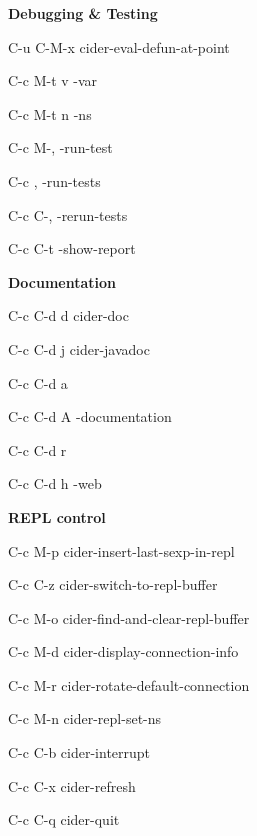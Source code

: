 \documentclass[a4paper,10pt]{article}
\renewcommand\section[1]{\bigskip\par\textbf{\large#1}\medskip}
\newcommand\keyify[1]{\keys{\ttfamily#1}}
\begin{document}
\begin{multicols}{2}
\columnbreak

\section{Debugging \& Testing}
\begin{keylist}[labelwidth=\widthof{\keyify{C-c C-d C-a}}]
\item[C-u C-M-x] cider-eval-defun-at-point
\item[C-c M-t v] -var
\item[C-c M-t n] \ns                    -ns
\item[C-c M-,] -run-test
\item[C-c ,]   \ns            -run-tests
\item[C-c C-,] \ns            -rerun-tests
\item[C-c C-t] \ns            -show-report
\end{keylist}

\section{Documentation}
\begin{keylist}[labelwidth=\widthof{\keyify{C-c C-d C-a}}]
  \item[C-c C-d d] cider-doc
  \item[C-c C-d j] cider-javadoc
  \item[C-c C-d a] 
  \item[C-c C-d A] \ns               -documentation
  \item[C-c C-d r] 
  \item[C-c C-d h] \ns                -web
\end{keylist}

\section{REPL control}
\begin{keylist}[labelwidth=\widthof{\keyify{C-c M-c}}]
  \item[C-c M-p] cider-insert-last-sexp-in-repl
  \item[C-c C-z] cider-switch-to-repl-buffer
  \item[C-c M-o] cider-find-and-clear-repl-buffer
  \item[C-c M-d] cider-display-connection-info
  \item[C-c M-r] cider-rotate-default-connection
  \item[C-c M-n] cider-repl-set-ns
  \item[C-c C-b] cider-interrupt
  \item[C-c C-x] cider-refresh
  \item[C-c C-q] cider-quit
\end{keylist}
\end{multicols}
\end{document}
